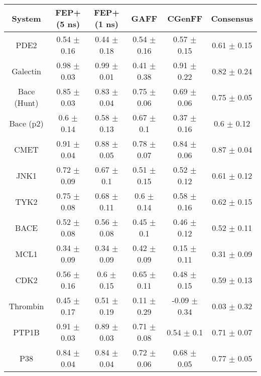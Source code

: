 \begin{table}[h!]
{
\begin{tabular}{ c c c c c c}
System & FEP+ (5 ns) & FEP+ (1 ns) & GAFF & CGenFF & Consensus \\
\hline
PDE2 & 0.54 $\pm$ 0.16 & 0.44 $\pm$ 0.18 & 0.54 $\pm$ 0.16 & 0.57 $\pm$ 0.15 & 0.61 $\pm$ 0.15 \\
Galectin & 0.98 $\pm$ 0.03 & 0.99 $\pm$ 0.01 & 0.41 $\pm$ 0.38 & 0.91 $\pm$ 0.22 & 0.82 $\pm$ 0.24 \\
Bace (Hunt) & 0.85 $\pm$ 0.03 & 0.83 $\pm$ 0.04 & 0.75 $\pm$ 0.06 & 0.69 $\pm$ 0.06 & 0.75 $\pm$ 0.05 \\
Bace (p2) & 0.6 $\pm$ 0.14 & 0.58 $\pm$ 0.13 & 0.67 $\pm$ 0.1 & 0.37 $\pm$ 0.16 & 0.6 $\pm$ 0.12 \\
CMET & 0.91 $\pm$ 0.04 & 0.88 $\pm$ 0.05 & 0.78 $\pm$ 0.07 & 0.84 $\pm$ 0.06 & 0.87 $\pm$ 0.04 \\
JNK1 & 0.72 $\pm$ 0.09 & 0.67 $\pm$ 0.1 & 0.51 $\pm$ 0.15 & 0.52 $\pm$ 0.12 & 0.61 $\pm$ 0.12 \\
TYK2 & 0.75 $\pm$ 0.08 & 0.68 $\pm$ 0.11 & 0.6 $\pm$ 0.14 & 0.58 $\pm$ 0.16 & 0.62 $\pm$ 0.15 \\
BACE & 0.52 $\pm$ 0.08 & 0.56 $\pm$ 0.08 & 0.45 $\pm$ 0.1 & 0.46 $\pm$ 0.12 & 0.52 $\pm$ 0.11 \\
MCL1 & 0.34 $\pm$ 0.09 & 0.34 $\pm$ 0.09 & 0.42 $\pm$ 0.09 & 0.15 $\pm$ 0.11 & 0.31 $\pm$ 0.09 \\
CDK2 & 0.56 $\pm$ 0.16 & 0.6 $\pm$ 0.15 & 0.65 $\pm$ 0.11 & 0.48 $\pm$ 0.15 & 0.59 $\pm$ 0.13 \\
Thrombin & 0.45 $\pm$ 0.17 & 0.51 $\pm$ 0.19 & 0.11 $\pm$ 0.29 & -0.09 $\pm$ 0.34 & 0.03 $\pm$ 0.32 \\
PTP1B & 0.91 $\pm$ 0.03 & 0.89 $\pm$ 0.03 & 0.71 $\pm$ 0.08 & 0.54 $\pm$ 0.1 & 0.71 $\pm$ 0.07 \\
P38 & 0.84 $\pm$ 0.04 & 0.84 $\pm$ 0.04 & 0.72 $\pm$ 0.06 & 0.68 $\pm$ 0.05 & 0.77 $\pm$ 0.05 \\
\hline
\end{tabular}
}
\label{cor}
\end{table}
